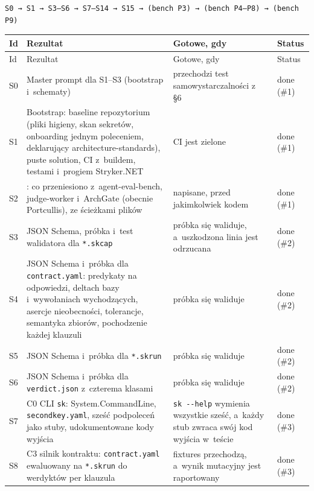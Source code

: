 \begin{lstlisting}
S0 → S1 → S3–S6 → S7–S14 → S15 → (bench P3) → (bench P4–P8) → (bench P9)
\end{lstlisting}

{\footnotesize
\begin{xltabular}{\linewidth}{@{}l >{\raggedright\arraybackslash}X >{\raggedright\arraybackslash}p{4.2cm} >{\raggedright\arraybackslash}p{2.2cm}@{}}
\toprule
Id & Rezultat & Gotowe, gdy & Status \\
\midrule
\endfirsthead
\toprule
Id & Rezultat & Gotowe, gdy & Status \\
\midrule
\endhead
\bottomrule
\endlastfoot
S0 & Master prompt dla S1–S3 (bootstrap i~schematy) & przechodzi test samowystarczalności z~ §6 & done (\#1) \\
S1 & Bootstrap: baseline repozytorium (pliki higieny, skan sekretów, onboarding jednym
poleceniem,  deklarujący architecture-standards), puste
solution, CI z~buildem, testami i~progiem Stryker.NET & CI jest zielone & done (\#1) \\
S2 & : co przeniesiono z~agent-eval-bench, judge-worker i~ArchGate (obecnie Portcullis), ze ścieżkami plików & napisane, przed jakimkolwiek kodem &
done (\#1) \\
S3 & JSON Schema, próbka i~test walidatora dla \texttt{*.skcap} & próbka się waliduje, a~uszkodzona linia jest odrzucana & done (\#2) \\
S4 & JSON Schema i~próbka dla \texttt{contract.yaml}: predykaty na odpowiedzi, deltach bazy
i~wywołaniach wychodzących, asercje nieobecności, tolerancje, semantyka zbiorów, pochodzenie
każdej klauzuli & próbka się waliduje & done (\#2) \\
S5 & JSON Schema i~próbka dla \texttt{*.skrun} & próbka się waliduje & done (\#2) \\
S6 & JSON Schema i~próbka dla \texttt{verdict.json} z~czterema klasami & próbka się waliduje
& done (\#2) \\
S7 & C0 CLI \texttt{sk}: System.CommandLine, \texttt{secondkey.yaml}, sześć podpoleceń jako
stuby, udokumentowane kody wyjścia & \texttt{sk -{}-help} wymienia wszystkie sześć, a~każdy
stub zwraca swój kod wyjścia w~teście & done (\#3) \\
S8 & C3 silnik kontraktu: \texttt{contract.yaml} ewaluowany na \texttt{*.skrun} do werdyktów
per klauzula & fixtures przechodzą, a~wynik mutacyjny jest raportowany & done (\#3) \\

\end{xltabular}}
